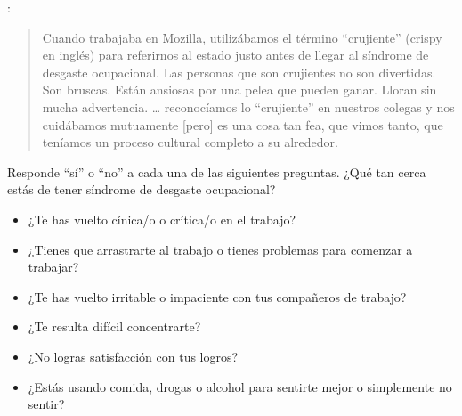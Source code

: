 
:

\begin{quote}
  Cuando trabajaba en Mozilla,
  utilizábamos el término ``crujiente'' (crispy en inglés) para referirnos al estado justo antes de llegar al síndrome de desgaste ocupacional.
  Las personas que son crujientes no son divertidas.
  Son bruscas.
  Están ansiosas por una pelea que pueden ganar.
  Lloran sin mucha advertencia.
  {\ldots} reconocíamos lo ``crujiente'' en  nuestros colegas y nos cuidábamos  mutuamente
  [pero] es una cosa tan fea, que vimos tanto, que teníamos un proceso cultural completo a su alrededor.
\end{quote}

\noindent
Responde ``sí'' o ``no'' a cada una de las siguientes preguntas.
¿Qué tan cerca estás de tener síndrome de desgaste ocupacional?

\begin{itemize}
\item ¿Te has vuelto cínica/o o crítica/o en el trabajo?
\item ¿Tienes que arrastrarte al trabajo o tienes problemas para comenzar a trabajar?
\item ¿Te has vuelto irritable o impaciente con tus compañeros de trabajo?
\item ¿Te resulta difícil concentrarte?
\item ¿No logras satisfacción con tus logros?
\item ¿Estás usando comida, drogas o alcohol para sentirte mejor o simplemente no sentir?
\end{itemize}

